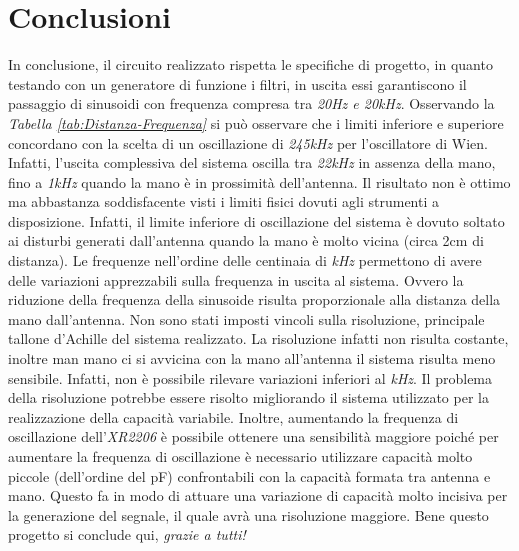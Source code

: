 \documentclass[titlepage]{report}
\begin{document}
\chapter{Conclusioni}
 	\label{ch:Conclusioni}
	In conclusione, il circuito realizzato rispetta le specifiche di progetto, in quanto testando con un generatore di funzione i filtri, in uscita essi garantiscono il passaggio di sinusoidi con frequenza compresa tra \textit{20Hz e 20kHz}. Osservando la \textit{Tabella \ref{tab:Distanza-Frequenza}} si può osservare che i limiti inferiore e superiore concordano con la scelta di un oscillazione di \textit{245kHz} per l'oscillatore di Wien. Infatti, l'uscita complessiva del sistema oscilla tra \textit{22kHz} in assenza della mano, fino a \textit{1kHz} quando la mano è in prossimità dell'antenna. Il risultato non è ottimo ma abbastanza soddisfacente visti i limiti fisici dovuti agli strumenti a disposizione. Infatti, il limite inferiore di oscillazione del sistema è dovuto soltato ai disturbi generati dall'antenna quando la mano è molto vicina (circa 2cm di distanza). Le frequenze nell'ordine delle centinaia di \textit{kHz} permettono di avere delle variazioni apprezzabili sulla frequenza in uscita al sistema. Ovvero la riduzione della frequenza della sinusoide risulta proporzionale alla distanza della mano dall'antenna.
	Non sono stati imposti vincoli sulla risoluzione, principale tallone d'Achille del sistema realizzato. La risoluzione infatti non risulta costante, inoltre man mano ci si avvicina con la mano all'antenna il sistema risulta meno sensibile. Infatti, non è possibile rilevare variazioni inferiori al \textit{kHz}.
	Il problema della risoluzione potrebbe essere risolto migliorando il sistema utilizzato per la realizzazione della capacità variabile. Inoltre, aumentando la frequenza di oscillazione dell'\textit{XR2206} è possibile ottenere una sensibilità maggiore poiché per aumentare la frequenza di oscillazione è necessario utilizzare capacità molto piccole (dell'ordine del pF) confrontabili con la capacità formata tra antenna e mano. Questo fa in modo di attuare una variazione di capacità molto incisiva per la generazione del segnale, il quale avrà una risoluzione maggiore.
	\newpage
	Bene questo progetto si conclude qui, \textit{grazie a tutti!}
	




	
\end{document}

